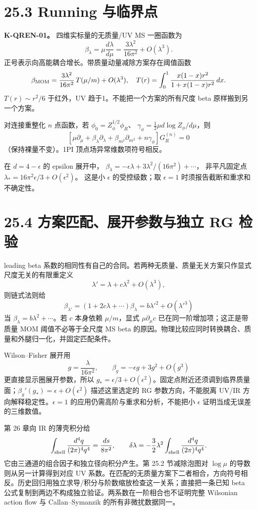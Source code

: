 \documentclass[
  11pt,
  oneside]{book}
\begin{document}
\section{25.3 Running 与临界点}

\textbf{K-QREN-01。} 四维实标量的无质量/UV MS 一圈函数为 \[
\beta_\lambda=\mu\frac{d\lambda}{d\mu}
=\frac{3\lambda^2}{16\pi^2}+O(\lambda^3).
\] 正号表示向高能耦合增长。带质量动量减除方案存在阈值函数 \[
\beta_{\rm MOM}=\frac{3\lambda^2}{16\pi^2}\,
T(\mu/m)+O(\lambda^3),\quad
T(r)=\int_0^1\frac{x(1-x)r^2}{1+x(1-x)r^2}\,dx.
\] \(T(r)\sim r^2/6\) 于红外，UV 趋于1。不能把一个方案的所有尺度 beta
原样搬到另一个方案。

对连接重整化 \(n\) 点函数，若 \(\phi_0=Z_\phi^{1/2}\phi_R\)、
\(\gamma_\phi=\tfrac12\mu d\log Z_\phi/d\mu\)，则 \[
[\mu\partial_\mu+\beta_\lambda\partial_\lambda+
\beta_{m^2}\partial_{m^2}+n\gamma_\phi]G_R^{(n)}=0
\] （保持裸量不变）。1PI 顶点场异常维数项符号相反。

在 \(d=4-\epsilon\) 的 epsilon 展开中，
\(\beta_\lambda=-\epsilon\lambda+3\lambda^2/(16\pi^2)+\cdots\)，
非平凡固定点 \(\lambda_*=16\pi^2\epsilon/3+O(\epsilon^2)\)。 这是小
\(\epsilon\) 的受控级数；取 \(\epsilon=1\)
时须报告截断和重求和不确定性。

\section{25.4 方案匹配、展开参数与独立 RG 检验}

leading beta
系数的相同性有自己的合同。若两种无质量、质量无关方案只作显式尺度无关的有限重定义
\[
\lambda'=\lambda+c\lambda^2+O(\lambda^3),
\] 则链式法则给 \[
\beta_{\lambda'}=(1+2c\lambda+\cdots)\beta_\lambda
=b\lambda'^2+O(\lambda'^3)
\] 当 \(\beta_\lambda=b\lambda^2+\cdots\)。若 \(c\) 本身依赖
\(\mu/m\)，显式 \(\mu\partial_\mu c\) 已在同一阶增加项；这正是带质量 MOM
阈值不必等于全尺度 MS beta
的原因。物理比较应同时转换耦合、质量和外腿归一化，并固定匹配条件。

Wilson--Fisher 展开用 \[
g=\frac{\lambda}{16\pi^2},\qquad
\beta_g=-\epsilon g+3g^2+O(g^3)
\] 更直接显示圈展开参数，所以
\(g_*=\epsilon/3+O(\epsilon^2)\)。固定点附近还须调到临界质量面；\(\beta_g'(g_*)=\epsilon+O(\epsilon^2)\)
描述这里选定的 RG 参数方向，不能脱离 UV/IR
方向解释稳定性。\(\epsilon=1\) 的应用仍需高阶与重求和分析，不能把小
\(\epsilon\) 证明当成无误差的三维数值。

第 26 章向 IR 的薄壳积分给 \[
\int_{\rm shell}\frac{d^4q}{(2\pi)^4q^4}=\frac{ds}{8\pi^2},
\qquad\delta\lambda=-\frac32\lambda^2\int_{\rm shell}\frac{d^4q}{(2\pi)^4q^4}.
\] 它由三通道的组合因子和独立径向积分产生。第 25.2 节减除泡图对
\(\log\mu\) 的导数则从另一计算得到对应 UV
系数。在匹配的无质量方案下二者相合，方向符号相反。历史回归用独立求导/积分与阶数缩放检查这一关系；直接把一条已知
beta 公式复制到两边不构成独立验证。两系数在一阶相合也不证明完整
Wilsonian action flow 与 Callan--Symanzik 的所有非微扰数据同一。
\end{document}

